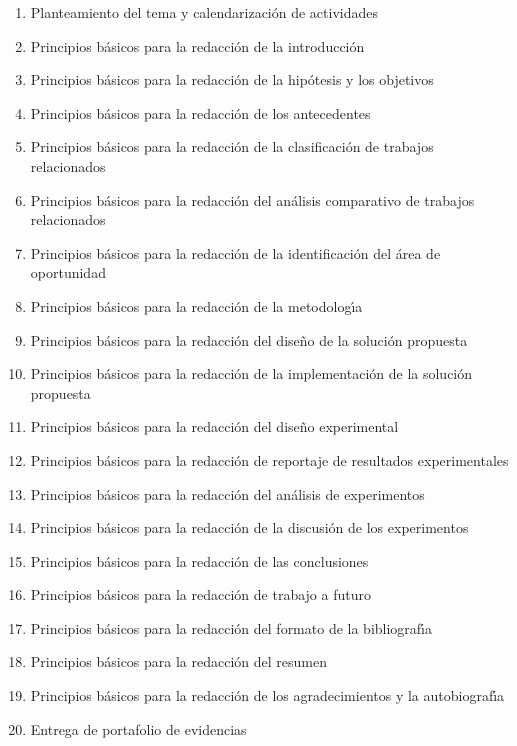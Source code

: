 \documentclass[10 pt]{article}
\begin{document}
\begin{enumerate}[itemsep=-2pt]
\item Planteamiento del tema y calendarizaci\'{o}n de actividades
\item Principios b\'{a}sicos para la redacci\'{o}n de la introducci\'{o}n
\item Principios b\'{a}sicos para la redacci\'{o}n de la hip\'{o}tesis y los objetivos
\item Principios b\'{a}sicos para la redacci\'{o}n de los antecedentes
\item Principios b\'{a}sicos para la redacci\'{o}n de la clasificaci\'{o}n de trabajos relacionados
\item Principios b\'{a}sicos para la redacci\'{o}n del an\'{a}lisis comparativo de trabajos relacionados
\item Principios b\'{a}sicos para la redacci\'{o}n de la identificaci\'{o}n del \'{a}rea de oportunidad
\item Principios b\'{a}sicos para la redacci\'{o}n de la metodolog\'{\i}a
\item Principios b\'{a}sicos para la redacci\'{o}n del dise\~{n}o de la soluci\'{o}n propuesta
\item Principios b\'{a}sicos para la redacci\'{o}n de la implementaci\'{o}n de la soluci\'{o}n propuesta
\item Principios b\'{a}sicos para la redacci\'{o}n del dise\~{n}o experimental
\item Principios b\'{a}sicos para la redacci\'{o}n de reportaje de resultados experimentales
\item Principios b\'{a}sicos para la redacci\'{o}n del an\'{a}lisis de experimentos
\item Principios b\'{a}sicos para la redacci\'{o}n de la discusi\'{o}n de los experimentos
\item Principios b\'{a}sicos para la redacci\'{o}n de las conclusiones
\item Principios b\'{a}sicos para la redacci\'{o}n de trabajo a futuro
\item Principios b\'{a}sicos para la redacci\'{o}n del formato de la bibliograf\'{\i}a
\item Principios b\'{a}sicos para la redacci\'{o}n del resumen
\item Principios b\'{a}sicos para la redacci\'{o}n de los agradecimientos y la autobiograf\'{\i}a
\item Entrega de portafolio de evidencias
\end{enumerate}
\end{document}

